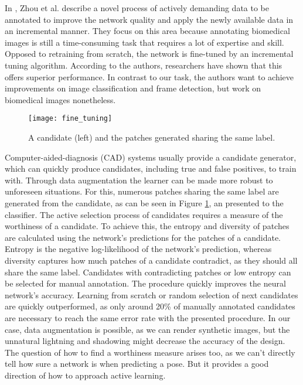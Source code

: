 In \cite{zhou}, Zhou et al. describe a novel process of actively demanding data to be annotated to improve the network quality and apply the newly available data in an incremental manner. They focus on this area because annotating biomedical images is still a time-consuming task that requires a lot of expertise and skill.
\nnewline
Opposed to retraining from scratch, the network is fine-tuned by an incremental tuning algorithm. According to the authors, researchers have shown that this offers superior performance. In contrast to our task, the authors want to achieve improvements on image classification and frame detection, but work on biomedical images nonetheless.
\nnewline
\begin{figure}[!tbp]
	\centering
    \texttt{[image: fine\_tuning]}
	\caption{A candidate (left) and the patches generated sharing the same label. \cite{zhou}}
	\label{fig:zhou}
\end{figure}
Computer-aided-diagnosis (CAD) systems usually provide a candidate generator, which can quickly produce candidates, including true and false positives, to train with. Through data augmentation the learner can be made more robust to unforeseen situations. For this, numerous patches sharing the same label are generated from the candidate, as can be seen in Figure \ref{fig:zhou}, an presented to the classifier. 
\nnewline
The active selection process of candidates requires a measure of the worthiness of a candidate. To achieve this, the entropy and diversity of patches are calculated using the network's predictions for the patches of a candidate. Entropy is the negative log-likelihood of the network's prediction, whereas diversity captures how much patches of a candidate contradict, as they should all share the same label. Candidates with contradicting patches or low entropy can be selected for manual annotation.
\nnewline
The procedure quickly improves the neural network's accuracy. Learning from scratch or random selection of next candidates are quickly  outperformed, as only around 20\% of manually annotated candidates are necessary to reach the same error rate with the presented procedure.
\nnewline
In our case, data augmentation is possible, as we can render synthetic images, but the unnatural lightning and shadowing might decrease the accuracy of the design. The question of how to find  a worthiness measure arises too, as we can't directly tell how sure a network is when predicting a pose. But it provides a good direction of how to approach active learning.

